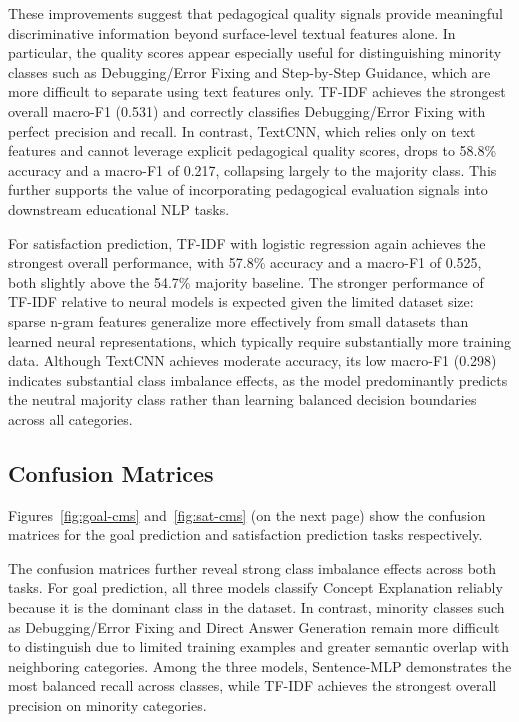 These improvements suggest that pedagogical quality signals provide meaningful discriminative information beyond surface-level textual features alone. In particular, the quality scores appear especially useful for distinguishing minority classes such as Debugging/Error Fixing and Step-by-Step Guidance, which are more difficult to separate using text features only. TF-IDF achieves the strongest overall macro-F1 (0.531) and correctly classifies Debugging/Error Fixing with perfect precision and recall. In contrast, TextCNN, which relies only on text features and cannot leverage explicit pedagogical quality scores, drops to 58.8\% accuracy and a macro-F1 of 0.217, collapsing largely to the majority class. This further supports the value of incorporating pedagogical evaluation signals into downstream educational NLP tasks.

For satisfaction prediction, TF-IDF with logistic regression again achieves the strongest overall performance, with 57.8\% accuracy and a macro-F1 of 0.525, both slightly above the 54.7\% majority baseline. The stronger performance of TF-IDF relative to neural models is expected given the limited dataset size: sparse n-gram features generalize more effectively from small datasets than learned neural representations, which typically require substantially more training data. Although TextCNN achieves moderate accuracy, its low macro-F1 (0.298) indicates substantial class imbalance effects, as the model predominantly predicts the neutral majority class rather than learning balanced decision boundaries across all categories.

\subsection{Confusion Matrices}

Figures~\ref{fig:goal-cms} and~\ref{fig:sat-cms} (on the next page) show the confusion matrices for the goal prediction and satisfaction prediction tasks respectively.

The confusion matrices further reveal strong class imbalance effects across both tasks. For goal prediction, all three models classify Concept Explanation reliably because it is the dominant class in the dataset. In contrast, minority classes such as Debugging/Error Fixing and Direct Answer Generation remain more difficult to distinguish due to limited training examples and greater semantic overlap with neighboring categories. Among the three models, Sentence-MLP demonstrates the most balanced recall across classes, while TF-IDF achieves the strongest overall precision on minority categories.

